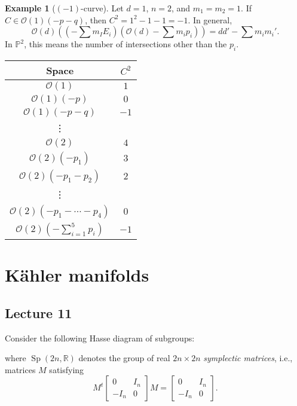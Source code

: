 \documentclass[10pt,letterpaper,cm]{nupset}
\theoremstyle{definition}
\newtheorem{exmp}[defn]{Example}
\theoremstyle{theorem}
\theoremstyle{remark}
\newcommand{\C}{\mathbb C}
\renewcommand{\O}{\mathcal O}
\renewcommand{\P}{\mathbb P}
\newcommand{\R}{\mathbb{R}}
\newcommand{\1}{\mathbb{1}}
\newcommand{\0}{\vec 0}
\DeclareMathOperator{\Sp}{Sp}
\DeclareMathOperator{\GL}{GL}
\DeclareMathOperator{\SO}{SO}
\DeclareMathOperator{\U}{U}
\begin{document}
\begin{exmp}[$\left({-1}\right)$-curve]
Let $d=1$, $n=2$, and $m_1=m_2 =1$. If $C\in \O(1)({-p}-q)$, then $C^2 =1^2 -1-1 = {-1}$. In general, 
\[
\O(d)\left (\left({-\sum m_IE_i}\right)\left(\O(d) -\sum m_ip_i\right)\right) = dd' -\sum{m_im_i'}.
\] In $\P^2$, this means the number of intersections other than the $p_i$.
\begin{table}[H]
\centering
\begin{tabular}{c|c}
Space & $C^2$ \\ \hline
$\O(1)$ & $1$ \\
$\O(1)({-p})$ & $0$ \\
$\O(1)({-p}-q)$ & ${-1}$ \\
\vdots &  \\
$\O(2)$ & $4$ \\
$\O(2)\left({-p}_1\right)$ & $3$ \\
$\O(2)\left({-p_1} -p_2\right)$ & $2$ \\
\vdots &  \\
$\O(2)\left({-p_1} -\cdots - p_4\right)$ & $0$ \\
$\O(2)\left({-\sum_{i=1}^5 p_i}\right)$ & ${-1}$
\end{tabular}
\end{table}
\end{exmp}

\section{K\"ahler manifolds}

\subsection{Lecture 11}

Consider the following Hasse diagram of subgroups:

\begin{center}
\end{center}

where $\Sp\left(2n, \R\right)$ denotes the group of real $2n\times 2n$ \textit{symplectic matrices}, i.e., matrices $M$ satisfying $$M^t{\begin{bmatrix} 0 & I_n \\ {-I_n} & 0 \end{bmatrix}}{M} = \begin{bmatrix} 0 & I_n \\ {-I_n} & 0 \end{bmatrix}.$$
\end{document}
